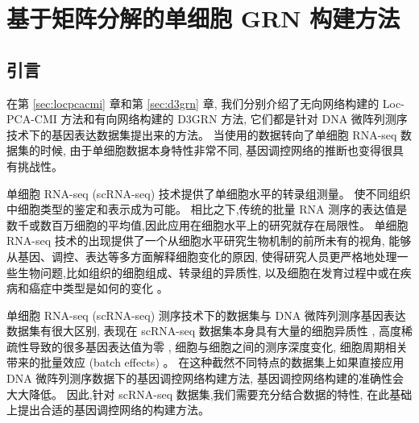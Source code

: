 \section{基于矩阵分解的单细胞 GRN 构建方法}
\label{sec:scgrnhunter}

\subsection{引言}

在第 \ref{sec:locpcacmi} 章和第 \ref{sec:d3grn} 章, 我们分别介绍了无向网络构建的 Loc-PCA-CMI 方法和有向网络构建的 D3GRN 方法, 
它们都是针对 DNA 微阵列测序技术下的基因表达数据集提出来的方法。
当使用的数据转向了单细胞 RNA-seq 数据集的时候, 由于单细胞数据本身特性非常不同, 基因调控网络的推断也变得很具有挑战性。

单细胞 RNA-seq (scRNA-seq) 技术提供了单细胞水平的转录组测量。
使不同组织中细胞类型的鉴定和表示成为可能。
相比之下,传统的批量 RNA 测序的表达值是数千或数百万细胞的平均值,因此应用在细胞水平上的研究就存在局限性。
单细胞 RNA-seq 技术的出现提供了一个从细胞水平研究生物机制的前所未有的视角,
能够从基因、调控、表达等多方面解释细胞变化的原因,
使得研究人员更严格地处理一些生物问题,比如组织的细胞组成、转录组的异质性,
以及细胞在发育过程中或在疾病和癌症中类型是如何的变化 \cite{kumar2017understanding,patel2014single}。

单细胞 RNA-seq (scRNA-seq) 测序技术下的数据集与 DNA 微阵列测序基因表达数据集有很大区别, 
表现在 scRNA-seq 数据集本身具有大量的细胞异质性 \cite{wagner2016revealing},
高度稀疏性导致的很多基因表达值为零 \cite{vallejos2017normalizing},
细胞与细胞之间的测序深度变化, 细胞周期相关带来的批量效应 (batch effects) \cite{buettner2015computational}。
在这种截然不同特点的数据集上如果直接应用 DNA 微阵列测序数据下的基因调控网络构建方法,
基因调控网络构建的准确性会大大降低。
%
因此,针对 scRNA-seq 数据集,我们需要充分结合数据的特性,
在此基础上提出合适的基因调控网络的构建方法。

